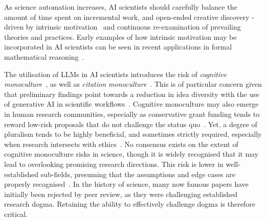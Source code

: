 \documentclass[11pt, a4paper, twocolumn, goog]{google}
\begin{document}
As science automation increases, AI scientists should carefully balance the amount of time spent on incremental work, and open-ended creative discovery - driven by intrinsic motivation~\citep{chentanez2004intrinsically, barto2012intrinsic, kulkarni2016hierarchical, achiam2017surprise, aubret2019survey} and continuous re-examination of prevailing theories and practices. Early examples of how intrinsic motivation may be incorporated in AI scientists can be seen in recent applications in formal mathematical reasoning~\citep{NEURIPS2024_4b8001fc}.

The utilisation of LLMs in AI scientists introduces the risk of \emph{cognitive monoculture}~\citep{fazelpour2026navigatingepistemicmonoculturesaidriven}, as well as \emph{citation monoculture}~\citep{alemohammad2026aiwritesgetscited}. This is of particular concern given that preliminary findings point towards a reduction in idea diversity with the use of generative AI in scientific workflows~\citep{hao2026artificial, meincke2025chatgpt, traberg2026ai}. Cognitive monoculture may also emerge in human research communities, especially as conservative grant funding tends to reward low-risk proposals that do not challenge the status quo~\citep{schweiger2024costs}. Yet, a degree of pluralism tends to be highly beneficial, and sometimes strictly required, especially when research intersects with ethics~\citep{chandak2026does}. No consensus exists on the extent of cognitive monoculture risks in science, though it is widely recognised that it may lead to overlooking promising research directions. This risk is lower in well-established sub-fields, presuming that the assumptions and edge cases are properly recognised~\citep{hedden2026algorithmicmonoculturecritics}. In the history of science, many now famous papers have initially been rejected by peer review, as they were challenging established research dogma. Retaining the ability to effectively challenge dogma is therefore critical.
\end{document}
